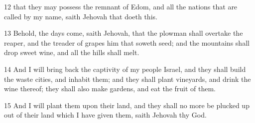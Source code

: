 \par 12 that they may possess the remnant of Edom, and all the nations that are called by my name, saith Jehovah that doeth this.
\par 13 Behold, the days come, saith Jehovah, that the plowman shall overtake the reaper, and the treader of grapes him that soweth seed; and the mountains shall drop sweet wine, and all the hills shall melt.
\par 14 And I will bring back the captivity of my people Israel, and they shall build the waste cities, and inhabit them; and they shall plant vineyards, and drink the wine thereof; they shall also make gardens, and eat the fruit of them.
\par 15 And I will plant them upon their land, and they shall no more be plucked up out of their land which I have given them, saith Jehovah thy God.

